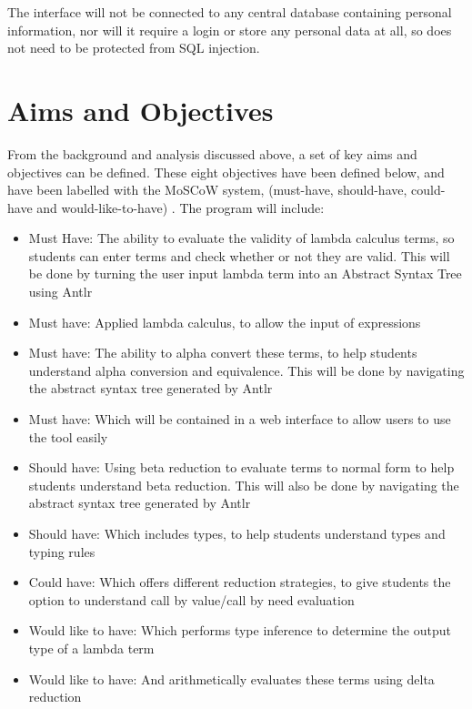 \documentclass[a4paper,11pt]{report}
\begin{document}
The interface will not be connected to any central database containing personal information, nor will it require a login or store any personal data at all, so does not need to be protected from SQL injection.\\

\chapter{Aims and Objectives}

From the background and analysis discussed above, a set of key aims and objectives can be defined. These eight objectives have been defined below, and have been labelled with the MoSCoW system, (must-have, should-have, could-have and would-like-to-have) \cite{Agile2014}.
The program will include:

\begin{itemize}
	\item Must Have: The ability to evaluate the validity of lambda calculus terms, so students can enter terms and check whether or not they are valid. This will be done by turning the user input lambda term into an Abstract Syntax Tree using Antlr
	\item Must have: Applied lambda calculus, to allow the input of expressions
	\item Must have: The ability to alpha convert these terms, to help students understand alpha conversion and equivalence. This will be done by navigating the abstract syntax tree generated by Antlr
	\item Must have: Which will be contained in a web interface to allow users to use the tool easily
	\item Should have: Using beta reduction to evaluate terms to normal form to help students understand beta reduction. This will also be done by navigating the abstract syntax tree generated by Antlr
	\item Should have: Which includes types, to help students understand types and typing rules
	\item Could have: Which offers different reduction strategies, to give students the option to understand call by value/call by need evaluation
	\item Would like to have: Which performs type inference to determine the output type of a lambda term
	\item Would like to have: And arithmetically evaluates these terms using delta reduction	
\end{itemize}
\end{document}
